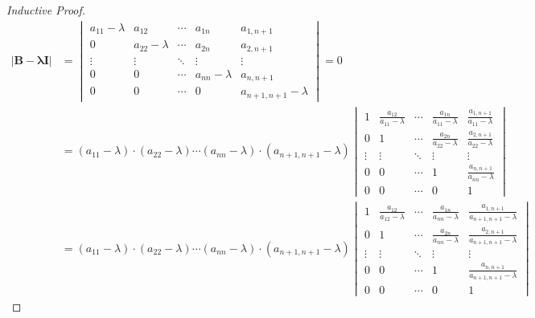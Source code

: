 \documentclass[12pt,a4paper]{article}
\begin{document}
\begin{proof}[Inductive Proof]
\begin{align*}
|\mathbf{B -\lambda \mathbf{I}}| &= \begin{vmatrix}
a_{11} - \lambda & a_{12} & \cdots & a_{1n} & a_{1,n+1} \\
0 & a_{22}-\lambda & \cdots & a_{2n} & a_{2,n+1} \\
\vdots & \vdots & \ddots & \vdots & \vdots \\
0 & 0 & \cdots & a_{nn} -\lambda & a_{n,n+1} \\
0 & 0 & \cdots & 0 & a_{n+1,n+1} -\lambda
\end{vmatrix} =0\\
&= (a_{11} - \lambda) \cdot (a_{22} - \lambda) \cdots (a_{nn} - \lambda) \cdot (a_{n+1,n+1} - \lambda)
\begin{vmatrix}
1 & \frac{a_{12}}{a_{11} - \lambda} & \cdots & \frac{a_{1n}}{a_{11} - \lambda} & \frac{a_{1,n+1}}{a_{11} - \lambda} \\
0 & 1 & \cdots & \frac{a_{2n}}{a_{22} - \lambda} & \frac{a_{2,n+1}}{a_{22} - \lambda} \\
\vdots & \vdots & \ddots & \vdots & \vdots \\
0 & 0 & \cdots & 1 & \frac{a_{n,n+1}}{a_{nn} - \lambda} \\
0 & 0 & \cdots & 0 & 1
\end{vmatrix}\\
&=(a_{11} - \lambda) \cdot (a_{22} - \lambda) \cdots (a_{nn} - \lambda) \cdot (a_{n+1,n+1} - \lambda)\begin{vmatrix}
1 & \frac{a_{12}}{a_{12} - \lambda} & \cdots & \frac{a_{1n}}{a_{nn} - \lambda} & \frac{a_{1,n+1}}{a_{{n+1,n+1}} - \lambda} \\
0 & 1 & \cdots & \frac{a_{2n}}{a_{nn} - \lambda} & \frac{a_{2,n+1}}{a_{{n+1,n+1}} - \lambda} \\
\vdots & \vdots & \ddots & \vdots & \vdots \\
0 & 0 & \cdots & 1 & \frac{a_{n,n+1}}{a_{n+1,n+1} - \lambda} \\
0 & 0 & \cdots & 0 & 1
\end{vmatrix}
\end{align*}


\end{proof}
\end{document}
